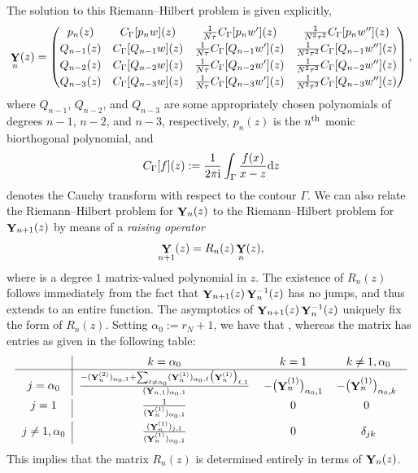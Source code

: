 \documentclass[10pt,a4paper]{amsart}
\DeclareMathOperator{\YY}{{\bf Y}}
\numberwithin{equation}{section}
\begin{document}
The solution to this Riemann--Hilbert problem is given explicitly,
 \begin{equation*}
 \YY_n(z) =
 \begin{pmatrix}
 p_n(z) & C_\Gamma[p_n w](z) & \frac{1}{N\tau} C_\Gamma[p_n w'](z) & \frac{1}{N^2\tau^2} C_\Gamma[p_n w''](z)\\[0.9mm]
 Q_{n-1}(z) & C_\Gamma[Q_{n-1} w](z) & \frac{1}{N\tau} C_\Gamma[Q_{n-1} w'](z) & \frac{1}{N^2\tau^2} C_\Gamma[Q_{n-1} w''](z)\\[0.9mm]
 Q_{n-2}(z) & C_\Gamma[Q_{n-2} w](z) & \frac{1}{N\tau} C_\Gamma[Q_{n-2} w'](z) & \frac{1}{N^2\tau^2} C_\Gamma[Q_{n-2} w''](z)\\[0.9mm]
 Q_{n-3}(z) & C_\Gamma[Q_{n-3} w](z) & \frac{1}{N\tau} C_\Gamma[Q_{n-3} w'](z) & \frac{1}{N^2\tau^2} C_\Gamma[Q_{n-3} w''](z)
 \end{pmatrix},
 \end{equation*}
where $Q_{n-1}$, $Q_{n-2}$, and $Q_{n-3}$ are some appropriately chosen polynomials of degrees $n-1$, $n-2$, and $n-3$, respectively, $p_n(z)$ is the
$n^{\rm th}$ monic biorthogonal polynomial, and
 \begin{equation*}
 C_{\Gamma}[f](z) := \frac{1}{2\pi {\rm i}} \int_{\Gamma} \frac{f(x)}{x-z} {\rm d}z
 \end{equation*}
denotes the Cauchy transform with respect to the contour $\Gamma$. We can also relate the Riemann--Hilbert problem for $\YY_n(z)$ to the Riemann--Hilbert
problem for $\YY_{n+1}(z)$ by means of a \textit{raising operator}
 \begin{equation*}
 \YY_{n+1}(z) = R_n(z) \YY_n(z),
 \end{equation*}
where  is a degree $1$ matrix-valued polynomial in $z$. The existence of $R_n(z)$ follows immediately from the fact that
$\YY_{n+1}(z)\YY_n^{-1}(z)$ has no jumps, and thus extends to an entire function. The asymptotics of $\YY_{n+1}(z)\YY_n^{-1}(z)$ uniquely fix the form of
$R_n(z)$. Setting $\alpha_0 := r_N + 1$, we have that , whereas the matrix  has entries as given in the following table:
 \begin{equation*}%
 \begin{tabular}{c| c c c }
 & $k=\alpha_0$ & $k = 1$ & $k\neq 1, \alpha_0$\\
 \hline
 $j=\alpha_0$ & $\frac{-(\YY_{n}^{(2)})_{\alpha_0,1} +\sum_{\ell\neq \alpha_0} (\YY_{n}^{(1)})_{\alpha_0,\ell} \bigl(\YY_{n}^{(1)}\bigr)_{\ell,1}}{(\YY_{n,1})_{\alpha_0,1}}$ & $-\bigl(\YY_{n}^{(1)}\bigr)_{\alpha_0,1}$ & $-\bigl(\YY_{n}^{(1)}\bigr)_{\alpha_0,k}$ \vspace{1mm}\\
 $j=1$ & $\frac{1}{(\YY_{n}^{(1)})_{\alpha_0,1}}$ & $0$ & $0$ \vspace{1mm}\\
 $j\neq 1, \alpha_0$ & $\frac{(\YY_{n}^{(1)})_{j,1}}{(\YY_{n}^{(1)})_{\alpha_0,1}}$ & $0$ & $\delta_{jk}$ \\
 \end{tabular}
 \end{equation*}
This implies that the matrix $R_n(z)$ is determined entirely in terms of $\YY_n(z)$.
\end{document}
